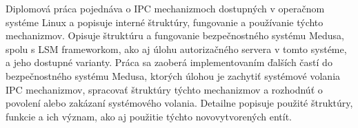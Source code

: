 Diplomová práca pojednáva o IPC mechanizmoch dostupných v operačnom systéme Linux a popisuje interné štruktúry, fungovanie a používanie týchto mechanizmov. Opisuje štruktúru a fungovanie bezpečnostného systému Medusa, spolu s LSM frameworkom, ako aj úlohu autorizačného servera v tomto systéme, a jeho dostupné varianty. Práca sa zaoberá implementovaním ďalších častí do bezpečnostného systému Medusa, ktorých úlohou je zachytiť systémové volania IPC mechanizmov, spracovať štruktúry týchto mechanizmov a rozhodnúť o povolení alebo zakázaní systémového volania. Detailne popisuje použité štruktúry, funkcie a ich význam, ako aj použitie týchto novovytvorených entít.